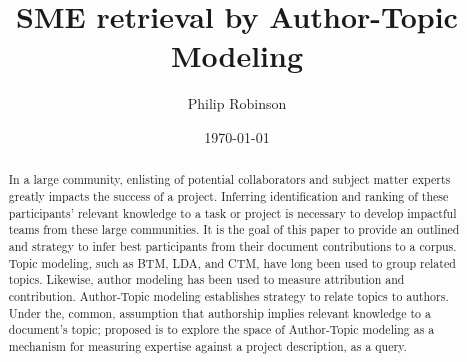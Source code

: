 \documentclass{article}
\title{SME retrieval by Author-Topic Modeling}
\date{\today}
\author{Philip Robinson}
\affil{NASA: Jet Propoultion Labratory}
\begin{document}
\maketitle

\begin{abstract}
  In a large community, enlisting of potential collaborators and subject matter experts
  greatly impacts the success of a project. Inferring identification and ranking of
  these participants' relevant knowledge to a task or project is necessary to develop
  impactful teams from these large communities\cite{Minto2007}. It is the goal of this
  paper to provide an outlined and strategy to infer best participants from their
  document contributions to a corpus. Topic modeling, such as BTM\cite{Yan2013,Chen2015}, LDA,
  and CTM, have long been used to group related topics\cite{Alghamdi2015}. Likewise,
  author modeling has been used to measure attribution\cite{Rexha2018} and
  contribution\cite{AldebeiHJ016}. Author-Topic modeling establishes strategy to
  relate topics to authors\cite{Rosen-Zvi2004}. Under the, common, assumption that
  authorship implies relevant knowledge to a document's topic; proposed is to explore
  the space of Author-Topic modeling as a mechanism for measuring expertise against a
  project description, as a query.
\end{abstract}

\end{document}
